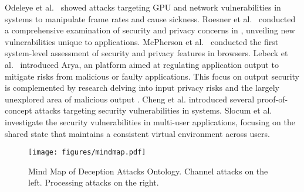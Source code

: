 Odeleye et al.~\cite{odeleye2021detecting} showed attacks targeting GPU and network vulnerabilities in \VR systems to manipulate frame rates and cause \VR sickness. 
Roesner et al.~\cite{Roesner2011Security} conducted a comprehensive examination of security and privacy concerns in \AR, unveiling new vulnerabilities unique to \AR applications. 
McPherson et al.~\cite{10.1145/2736277.2741657} conducted the first system-level assessment of security and privacy features in \AR browsers. 
Lebeck et al.~\cite{10.1145/2873587.2873595} introduced Arya, an \AR platform aimed at regulating application output to mitigate risks from malicious or faulty applications. 
This focus on output security is complemented by research delving into input privacy risks and the largely unexplored area of malicious \AR output \cite{inproceedings3}.
Cheng et al. \cite{cheng2024user} introduced several proof-of-concept attacks targeting \UI security vulnerabilities in \AR systems. %
Slocum et al. \cite{Slocum2024Shared} investigate the security vulnerabilities in multi-user \AR applications, focusing on the shared state that maintains a consistent virtual environment across users.


\begin{figure*}[t!]
    \centering
    \texttt{[image: figures/mindmap.pdf]}
    \caption{Mind Map of \MR Deception Attacks Ontology. Channel attacks on the left. Processing attacks on the right.} %
    \label{fig:attacks-mindmap}
    \vspace{-1ex}
\end{figure*}



